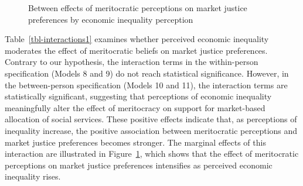 \documentclass[
  12pt,
]{article}
\begin{document}
\begin{figure}[H]

\caption{\label{fig-interact}Between effects of meritocratic perceptions
on market justice preferences by economic inequality perception}


\end{figure}%

Table~\ref{tbl-interactions1} examines whether perceived economic
inequality moderates the effect of meritocratic beliefs on market
justice preferences. Contrary to our hypothesis, the interaction terms
in the within-person specification (Models 8 and 9) do not reach
statistical significance. However, in the between-person specification
(Models 10 and 11), the interaction terms are statistically significant,
suggesting that perceptions of economic inequality meaningfully alter
the effect of meritocracy on support for market-based allocation of
social services. These positive effects indicate that, as perceptions of
inequality increase, the positive association between meritocratic
perceptions and market justice preferences becomes stronger. The
marginal effects of this interaction are illustrated in
Figure~\ref{fig-interact}, which shows that the effect of meritocratic
perceptions on market justice preferences intensifies as perceived
economic inequality rises.
\end{document}
